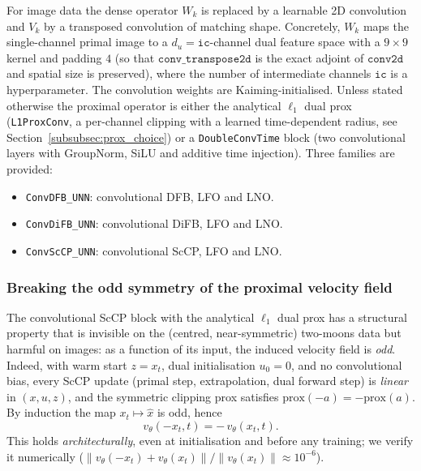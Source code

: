 For image data the dense operator $W_k$ is replaced by a learnable 2D
convolution and $V_k$ by a transposed convolution of matching shape. Concretely,
$W_k$ maps the single-channel primal image to a $d_u = \texttt{ic}$-channel dual
feature space with a $9\times 9$ kernel and padding $4$ (so that
$\texttt{conv\_transpose2d}$ is the exact adjoint of $\texttt{conv2d}$ and spatial
size is preserved), where the number of intermediate channels $\texttt{ic}$ is a
hyperparameter. The convolution weights are Kaiming-initialised. Unless stated
otherwise the proximal operator is either the analytical $\ell_1$ dual prox
(\texttt{L1ProxConv}, a per-channel clipping with a learned time-dependent radius,
see Section~\ref{subsubsec:prox_choice}) or a \texttt{DoubleConvTime} block (two
convolutional layers with GroupNorm, SiLU and additive time injection). Three
families are provided:
\begin{itemize}
    \item \texttt{ConvDFB\_UNN}: convolutional DFB, LFO and LNO.
    \item \texttt{ConvDiFB\_UNN}: convolutional DiFB, LFO and LNO.
    \item \texttt{ConvScCP\_UNN}: convolutional ScCP, LFO and LNO.
\end{itemize}



\subsubsection{Breaking the odd symmetry of the proximal velocity field}
\label{subsubsec:oddsym}

The convolutional ScCP block with the analytical $\ell_1$ dual prox has a
structural property that is invisible on the (centred, near-symmetric) two-moons
data but harmful on images: as a function of its input, the induced velocity
field is \emph{odd}. Indeed, with warm start $z = x_t$, dual initialisation
$u_0 = 0$, and no convolutional bias, every ScCP update
(primal step, extrapolation, dual forward step) is \emph{linear} in $(x,u,z)$,
and the symmetric clipping prox satisfies $\mathrm{prox}(-a) = -\mathrm{prox}(a)$.
By induction the map $x_t \mapsto \hat{x}$ is odd, hence
\begin{equation}
    v_\theta(-x_t, t) = -\,v_\theta(x_t, t) .
    \label{eq:oddness}
\end{equation}
This holds \emph{architecturally}, even at initialisation and before any
training; we verify it numerically ($\|v_\theta(-x_t)+v_\theta(x_t)\|/\|v_\theta(x_t)\|
\approx 10^{-6}$).

